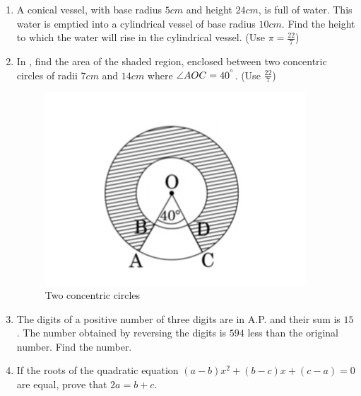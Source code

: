 \documentclass{article}
\begin{document}
\begin{enumerate}
 
\item A conical vessel, with base radius $5cm$ and height $24cm$, is full of water. This water is emptied into a cylindrical vessel of base radius $10cm$. Find the height to which the water will rise in the cylindrical vessel. (Use $\pi = \frac{22}{7}$)                                                                                                                                                                                          

\item In , find the area of the shaded region, enclosed between two concentric circles of radii $7cm$ and $14 cm$ where $\angle AOC = 40^{\degree}$. (Use $\frac{22}{7}$)
    \begin{figure}[H]
        \includegraphics[width=\columnwidth]{./figs/concentriccircle.jpg}                                       
        \caption{Two concentric circles}      
        \label{fig:concentriccircle}     
        \end{figure}                                                                                             
                                                  

\item The digits of a positive number of three digits are in A.P. and their sum is $15$. The number obtained by reversing the digits is $594$ less than the original number. Find the number.                                                                                             

\item If the roots of the quadratic equation $(a-b)x^2 + (b-c)x + (c-a) = 0$ are equal, prove that $2a = b + c$.                                                                                             


\end{enumerate}
\end{document}
